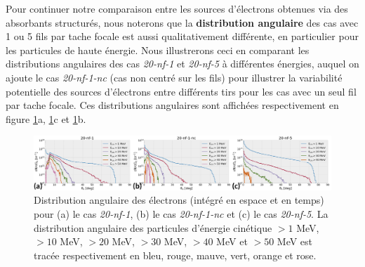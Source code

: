 \begin{refsection}
Pour continuer notre comparaison entre les sources d'électrons obtenues via des absorbants structurés, nous noterons que la \textbf{distribution angulaire} des cas avec 1 ou 5 fils par tache focale est aussi qualitativement différente, en particulier pour les particules de haute énergie. Nous illustrerons ceci en comparant les distributions angulaires des cas \textit{20-nf-1} et \textit{20-nf-5} à différentes énergies, auquel on ajoute le cas \textit{20-nf-1-nc} (cas non centré sur les fils) pour illustrer la variabilité potentielle des sources d'électrons entre différents tirs pour les cas avec un seul fil par tache focale. Ces distributions angulaires sont affichées respectivement en figure \ref{fig:62-distrib_angles_electrons}a, \ref{fig:62-distrib_angles_electrons}c et \ref{fig:62-distrib_angles_electrons}b.

\begin{figure}[hbtp]
	\centering
	\includegraphics[width=\linewidth]{6-opti_numerique/distribution_angle_electrons.png}
	\caption{Distribution angulaire des électrons (intégré en espace et en temps) pour (a) le cas \textit{20-nf-1}, (b) le cas \textit{20-nf-1-nc} et (c) le cas \textit{20-nf-5}. La distribution angulaire des particules d'énergie cinétique $>1$ MeV, $>10$ MeV, $>20$ MeV, $>30$ MeV, $>40$ MeV et $>50$ MeV est tracée respectivement en bleu, rouge, mauve, vert, orange et rose.}
	\label{fig:62-distrib_angles_electrons}
\end{figure}


\end{refsection}
